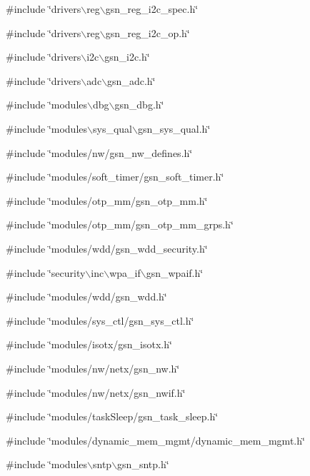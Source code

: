 {\ttfamily \#include \char`\"{}drivers$\backslash$reg$\backslash$gsn\_\-reg\_\-i2c\_\-spec.h\char`\"{}}\par
{\ttfamily \#include \char`\"{}drivers$\backslash$reg$\backslash$gsn\_\-reg\_\-i2c\_\-op.h\char`\"{}}\par
{\ttfamily \#include \char`\"{}drivers$\backslash$i2c$\backslash$gsn\_\-i2c.h\char`\"{}}\par
{\ttfamily \#include \char`\"{}drivers$\backslash$adc$\backslash$gsn\_\-adc.h\char`\"{}}\par
{\ttfamily \#include \char`\"{}modules$\backslash$dbg$\backslash$gsn\_\-dbg.h\char`\"{}}\par
{\ttfamily \#include \char`\"{}modules$\backslash$sys\_\-qual$\backslash$gsn\_\-sys\_\-qual.h\char`\"{}}\par
{\ttfamily \#include \char`\"{}modules/nw/gsn\_\-nw\_\-defines.h\char`\"{}}\par
{\ttfamily \#include \char`\"{}modules/soft\_\-timer/gsn\_\-soft\_\-timer.h\char`\"{}}\par
{\ttfamily \#include \char`\"{}modules/otp\_\-mm/gsn\_\-otp\_\-mm.h\char`\"{}}\par
{\ttfamily \#include \char`\"{}modules/otp\_\-mm/gsn\_\-otp\_\-mm\_\-grps.h\char`\"{}}\par
{\ttfamily \#include \char`\"{}modules/wdd/gsn\_\-wdd\_\-security.h\char`\"{}}\par
{\ttfamily \#include \char`\"{}security$\backslash$inc$\backslash$wpa\_\-if$\backslash$gsn\_\-wpaif.h\char`\"{}}\par
{\ttfamily \#include \char`\"{}modules/wdd/gsn\_\-wdd.h\char`\"{}}\par
{\ttfamily \#include \char`\"{}modules/sys\_\-ctl/gsn\_\-sys\_\-ctl.h\char`\"{}}\par
{\ttfamily \#include \char`\"{}modules/isotx/gsn\_\-isotx.h\char`\"{}}\par
{\ttfamily \#include \char`\"{}modules/nw/netx/gsn\_\-nw.h\char`\"{}}\par
{\ttfamily \#include \char`\"{}modules/nw/netx/gsn\_\-nwif.h\char`\"{}}\par
{\ttfamily \#include \char`\"{}modules/taskSleep/gsn\_\-task\_\-sleep.h\char`\"{}}\par
{\ttfamily \#include \char`\"{}modules/dynamic\_\-mem\_\-mgmt/dynamic\_\-mem\_\-mgmt.h\char`\"{}}\par
{\ttfamily \#include \char`\"{}modules$\backslash$sntp$\backslash$gsn\_\-sntp.h\char`\"{}}\par
